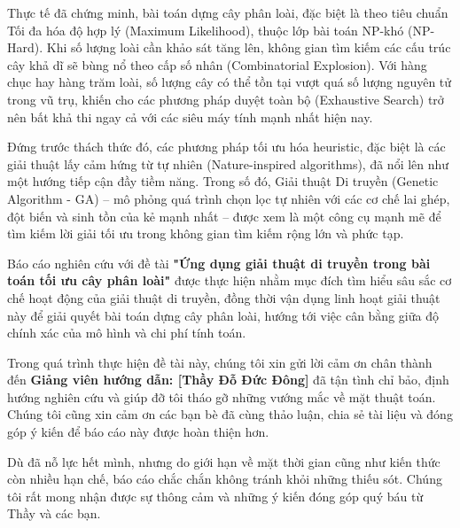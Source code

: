 \documentclass[12pt,a4paper]{report}
\begin{document}
Thực tế đã chứng minh, bài toán dựng cây phân loài, đặc biệt là theo tiêu chuẩn Tối đa hóa độ hợp lý (Maximum Likelihood), thuộc lớp bài toán NP-khó (NP-Hard). Khi số lượng loài cần khảo sát tăng lên, không gian tìm kiếm các cấu trúc cây khả dĩ sẽ bùng nổ theo cấp số nhân (Combinatorial Explosion). Với hàng chục hay hàng trăm loài, số lượng cây có thể tồn tại vượt quá số lượng nguyên tử trong vũ trụ, khiến cho các phương pháp duyệt toàn bộ (Exhaustive Search) trở nên bất khả thi ngay cả với các siêu máy tính mạnh nhất hiện nay.

Đứng trước thách thức đó, các phương pháp tối ưu hóa heuristic, đặc biệt là các giải thuật lấy cảm hứng từ tự nhiên (Nature-inspired algorithms), đã nổi lên như một hướng tiếp cận đầy tiềm năng. Trong số đó, Giải thuật Di truyền (Genetic Algorithm - GA) – mô phỏng quá trình chọn lọc tự nhiên với các cơ chế lai ghép, đột biến và sinh tồn của kẻ mạnh nhất – được xem là một công cụ mạnh mẽ để tìm kiếm lời giải tối ưu trong không gian tìm kiếm rộng lớn và phức tạp.

Báo cáo nghiên cứu với đề tài \textbf{"Ứng dụng giải thuật di truyền trong bài toán tối ưu cây phân loài"} được thực hiện nhằm mục đích tìm hiểu sâu sắc cơ chế hoạt động của giải thuật di truyền, đồng thời vận dụng linh hoạt giải thuật này để giải quyết bài toán dựng cây phân loài, hướng tới việc cân bằng giữa độ chính xác của mô hình và chi phí tính toán.

\vspace{0.5cm}

Trong quá trình thực hiện đề tài này, chúng tôi xin gửi lời cảm ơn chân thành đến \textbf{Giảng viên hướng dẫn: [Thầy Đỗ Đức Đông]} đã tận tình chỉ bảo, định hướng nghiên cứu và giúp đỡ tôi tháo gỡ những vướng mắc về mặt thuật toán. Chúng tôi cũng xin cảm ơn các bạn bè đã cùng thảo luận, chia sẻ tài liệu và đóng góp ý kiến để báo cáo này được hoàn thiện hơn.

Dù đã nỗ lực hết mình, nhưng do giới hạn về mặt thời gian cũng như kiến thức còn nhiều hạn chế, báo cáo chắc chắn không tránh khỏi những thiếu sót. Chúng tôi rất mong nhận được sự thông cảm và những ý kiến đóng góp quý báu từ Thầy và các bạn.


\begin{tabular}{l l }






\end{tabular}
\end{document}
